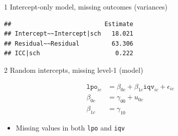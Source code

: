 \documentclass[ignorenonframetext,aspectratio=43]{beamer}
\newenvironment{Shaded}{\begin{snugshade}}{\end{snugshade}}
\newcommand{\KeywordTok}[1]{\textcolor[rgb]{0.13,0.29,0.53}{\textbf{#1}}}
\newcommand{\DataTypeTok}[1]{\textcolor[rgb]{0.13,0.29,0.53}{#1}}
\newcommand{\OtherTok}[1]{\textcolor[rgb]{0.56,0.35,0.01}{#1}}
\newcommand{\OperatorTok}[1]{\textcolor[rgb]{0.81,0.36,0.00}{\textbf{#1}}}
\newcommand{\NormalTok}[1]{#1}
\providecommand{\tightlist}{%
  \setlength{\itemsep}{0pt}\setlength{\parskip}{0pt}}
\begin{document}
\begin{frame}[fragile]{1 Intercept-only model, missing outcomes
(variances)}

\begin{Shaded}
\end{Shaded}

\begin{verbatim}
##                          Estimate
## Intercept~~Intercept|sch   18.021
## Residual~~Residual         63.306
## ICC|sch                     0.222
\end{verbatim}

\end{frame}

\begin{frame}[fragile]{2 Random intercepts, missing level-1 (model)}

\begin{align}
{{\texttt{lpo}}}_{ic} & = \beta_{0c} + \beta_{1c}{{\texttt{iqv}}}_{ic} + \epsilon_{ic}\\
\beta_{0c}     & = \gamma_{00} + u_{0c}\\
\beta_{1c}     & = \gamma_{10}
\end{align}

\begin{itemize}
\tightlist
\item
  Missing values in both \texttt{lpo} and \texttt{iqv}
\end{itemize}

\end{frame}
\end{document}
